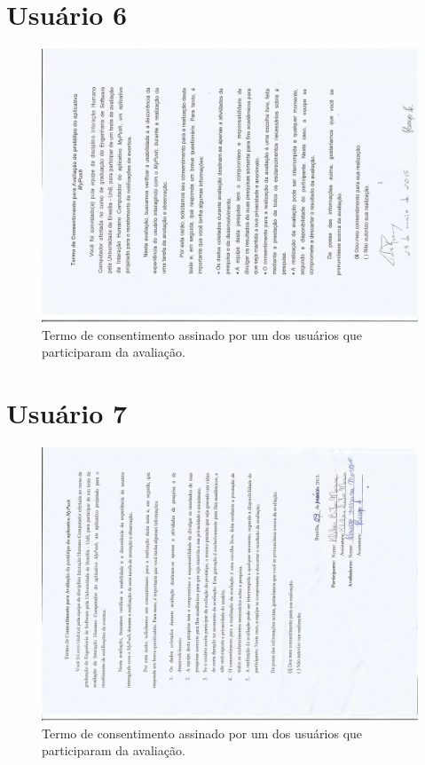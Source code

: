 \begin{anexosenv}
      \section*{Usuário 6}
    \begin{figure}[!htbp]
      \centering
      \includegraphics[scale=0.6, angle=-90]{editaveis/figuras/lidia}
      \caption{Termo de consentimento assinado por um dos usuários que participaram da avaliação.}
      \label{termo_consentimento_1}
    \end{figure}
    
      \section*{Usuário 7}
    \begin{figure}[!htbp]
      \centering
      \includegraphics[scale=0.6, angle=-90]{editaveis/figuras/kleber}
      \caption{Termo de consentimento assinado por um dos usuários que participaram da avaliação.}
      \label{termo_consentimento_1}
    \end{figure}
    

\end{anexosenv}
